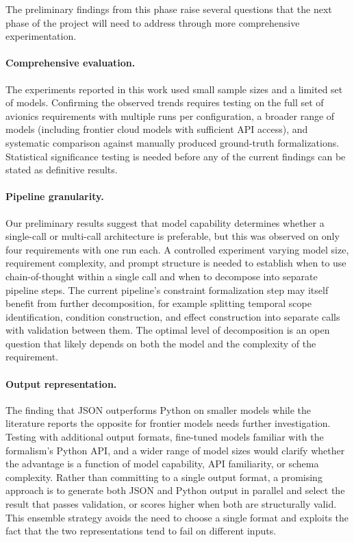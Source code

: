 The preliminary findings from this phase raise several questions that
the next phase of the project will need to address through more
comprehensive experimentation.

\paragraph{Comprehensive evaluation.}
The experiments reported in this work used small sample sizes and a
limited set of models. Confirming the observed trends requires testing
on the full set of avionics requirements with multiple runs per
configuration, a broader range of models (including frontier cloud
models with sufficient API access), and systematic comparison against
manually produced ground-truth formalizations. Statistical significance
testing is needed before any of the current findings can be stated as
definitive results.

\paragraph{Pipeline granularity.}
Our preliminary results suggest that model capability determines whether
a single-call or multi-call architecture is preferable, but this was
observed on only four requirements with one run each. A controlled
experiment varying model size, requirement complexity, and prompt
structure is needed to establish when to use chain-of-thought within a
single call and when to decompose into separate pipeline steps. The
current pipeline's constraint formalization step may itself benefit from
further decomposition, for example splitting temporal scope identification,
condition construction, and effect construction into separate calls with
validation between them. The optimal level of decomposition is an open
question that likely depends on both the model and the complexity of the
requirement.

\paragraph{Output representation.}
The finding that JSON outperforms Python on smaller models while the
literature reports the opposite for frontier models needs further
investigation. Testing with additional output formats, fine-tuned models
familiar with the formalism's Python API, and a wider range of model
sizes would clarify whether the advantage is a function of model
capability, API familiarity, or schema complexity. Rather than committing
to a single output format, a promising approach is to generate both JSON
and Python output in parallel and select the result that passes
validation, or scores higher when both are structurally valid. This
ensemble strategy avoids the need to choose a single format and exploits
the fact that the two representations tend to fail on different inputs.

